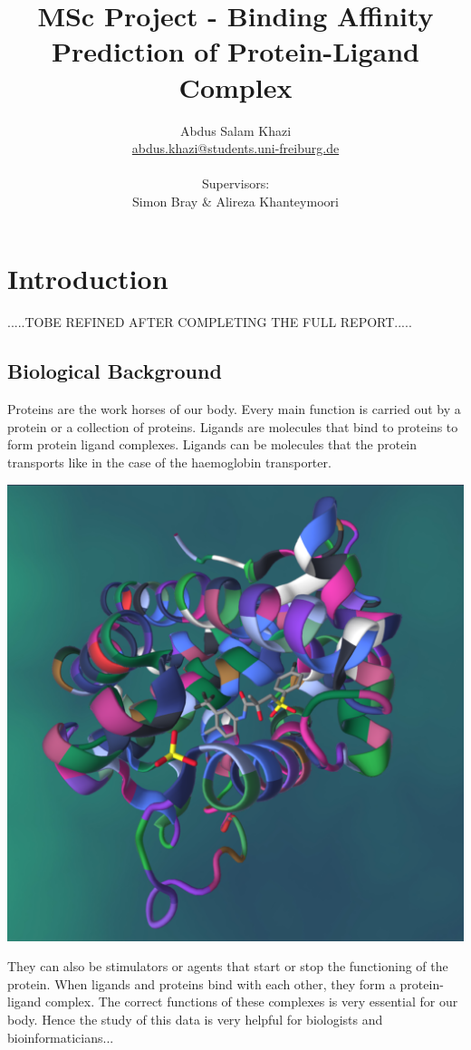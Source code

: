\documentclass[11pt]{article}
\title{MSc Project - Binding Affinity Prediction of Protein-Ligand Complex}
\author{
        Abdus Salam Khazi\\
        \href{mailto:abdus.khazi@students.uni-freiburg.de}
                {abdus.khazi@students.uni-freiburg.de}\\ \\
        Supervisors:
        \begin{tabular}{ll}
			Simon Bray \&
			Alireza Khanteymoori
		\end{tabular}
       }
\begin{document}
\maketitle
\date{}
\tableofcontents
\newpage

\section{Introduction}
.....TOBE REFINED AFTER COMPLETING THE FULL REPORT.....

\subsection{Biological Background}
Proteins are the work horses of our body.
Every main function is carried out by a protein or a collection of proteins.
Ligands are molecules that bind to proteins to form protein ligand complexes.
Ligands can be molecules that the protein transports like in the case of the haemoglobin
transporter.

\includegraphics[scale=0.15]{pl_complex}
\cite{PL_complex_introduction}


They can also be stimulators or agents that start or stop the functioning of the protein.
When ligands and proteins bind with each other, they form a protein-ligand complex.
The correct functions of these complexes is very essential for our body.
Hence the study of this data is very helpful for biologists and bioinformaticians...
\end{document}
